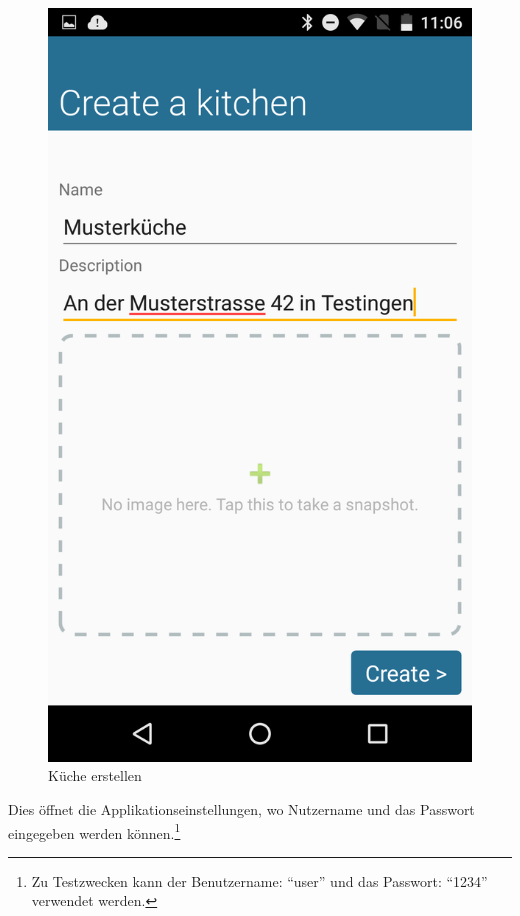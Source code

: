 \begin{figure}
	\vspace{-0.44cm}
	\includegraphics[scale=0.13]{results/res/create_kitchen}
	\caption{Küche erstellen}
\end{figure}
Dies öffnet die Applikationseinstellungen, wo Nutzername und das Passwort eingegeben werden können.\footnote{Zu Testzwecken kann der Benutzername: \enquote{user} und das Passwort: \enquote{1234} verwendet werden.}


